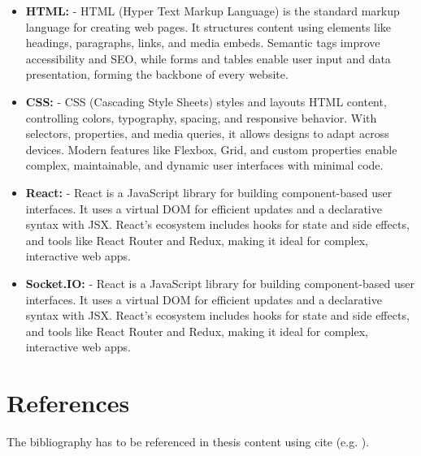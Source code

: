 \begin{itemize}
    \item \textbf{HTML:} - HTML (Hyper Text Markup Language) is the standard markup language for creating web pages. It structures content using elements like headings, paragraphs, links, and media embeds. Semantic tags improve accessibility and SEO, while forms and tables enable user input and data presentation, forming the backbone of every website.
    \item \textbf{CSS:} - CSS (Cascading Style Sheets) styles and layouts HTML content, controlling colors, typography, spacing, and responsive behavior. With selectors, properties, and media queries, it allows designs to adapt across devices. Modern features like Flexbox, Grid, and custom properties enable complex, maintainable, and dynamic user interfaces with minimal code.
    \item \textbf{React:} - React is a JavaScript library for building component-based user interfaces. It uses a virtual DOM for efficient updates and a declarative syntax with JSX. React’s ecosystem includes hooks for state and side effects, and tools like React Router and Redux, making it ideal for complex, interactive web apps.
    \item \textbf{Socket.IO:} - React is a JavaScript library for building component-based user interfaces. It uses a virtual DOM for efficient updates and a declarative syntax with JSX. React’s ecosystem includes hooks for state and side effects, and tools like React Router and Redux, making it ideal for complex, interactive web apps.
\end{itemize}


\section{References}
The bibliography has to be referenced in thesis content using cite (e.g. \cite{Bersani}).

